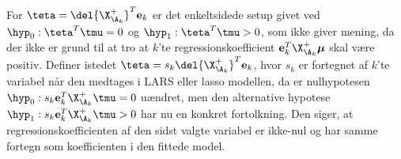 For \(\teta = \del{\X_{\A_k}^+}^T \mathbf{e}_k\) er det enkeltsidede setup givet ved \(\hyp_0: \teta^T \tmu = 0\) og  \(\hyp_1: \teta^T \tmu > 0\), som ikke giver mening, da der ikke er grund til at tro at \(k\)'te regressionskoefficient \(\mathbf{e}_k^T \X_{\A_k}^+ \boldsymbol{\mu}\) skal være positiv.
Definer istedet \(\teta = s_k \del{\X_{\A_k}^+}^T \mathbf{e}_k\), hvor \(s_k\) er fortegnet af \(k\)'te variabel når den medtages i LARS eller lasso modellen, da er nulhypotesen \(\hyp_0: s_k \mathbf{e}_k^T \X_{\A_k}^+ \tmu = 0\) uændret, men den alternative hypotese \(\hyp_1: s_k \mathbf{e}_k^T \X_{\A_k}^+ \tmu > 0\) har nu en konkret fortolkning.
Den siger, at regressionskoefficienten af den sidst valgte variabel er ikke-nul og har samme fortegn som koefficienten i den fittede model.